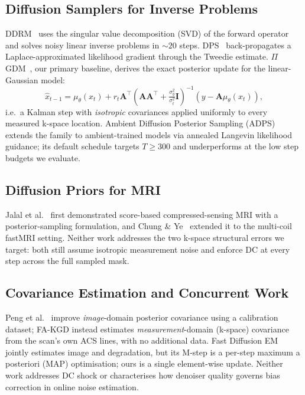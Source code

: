 \documentclass[conference]{IEEEtran}
\newcommand{\muth}{\mu_\theta}
\begin{document}
\subsection{Diffusion Samplers for Inverse Problems}

DDRM~\cite{kawar2022ddrm} uses the singular value decomposition (SVD) of
the forward operator and solves noisy linear inverse problems in ${\sim}20$
steps. DPS~\cite{chung2023dps} back-propagates a Laplace-approximated
likelihood gradient through the Tweedie estimate. $\Pi$GDM~\cite{song2023pigdm},
our primary baseline, derives the exact posterior update for the
linear-Gaussian model:
\begin{equation}
  \hat{x}_{t-1} = \muth(x_t) + r_t \mathbf{A}^\top
  \!\left(\mathbf{A}\mathbf{A}^\top + \tfrac{\sigma_y^2}{\sigma_t^2}
  \mathbf{I}\right)^{-1}\!\!(y - \mathbf{A}\muth(x_t)),
  \label{eq:pigdm}
\end{equation}
i.e.\ a Kalman step with \emph{isotropic} covariances applied uniformly to
every measured k-space location. Ambient Diffusion Posterior Sampling
(ADPS)~\cite{daras2025ambient} extends the family to ambient-trained models
via annealed Langevin likelihood guidance; its default schedule targets
$T\!\geq\!300$ and underperforms at the low step budgets we evaluate.

\subsection{Diffusion Priors for MRI}

Jalal et al.~\cite{jalal2021robust} first demonstrated score-based
compressed-sensing MRI with a posterior-sampling formulation, and Chung \&
Ye~\cite{chung2022scoremri} extended it to the multi-coil fastMRI setting.
Neither work addresses the two k-space structural errors we target: both
still assume isotropic measurement noise and enforce DC at every step across
the full sampled mask.

\subsection{Covariance Estimation and Concurrent Work}

Peng et al.~\cite{peng2024optimal} improve \emph{image}-domain posterior
covariance using a calibration dataset; FA-KGD instead estimates
\emph{measurement}-domain (k-space) covariance from the scan's own ACS lines,
with no additional data. Fast Diffusion EM~\cite{laroche2024fastdiffem}
jointly estimates image and degradation, but its M-step is a per-step
maximum a posteriori (MAP) optimisation; ours is a single element-wise
update. Neither work addresses
DC shock or characterises how denoiser quality governs bias correction in
online noise estimation.
\end{document}
